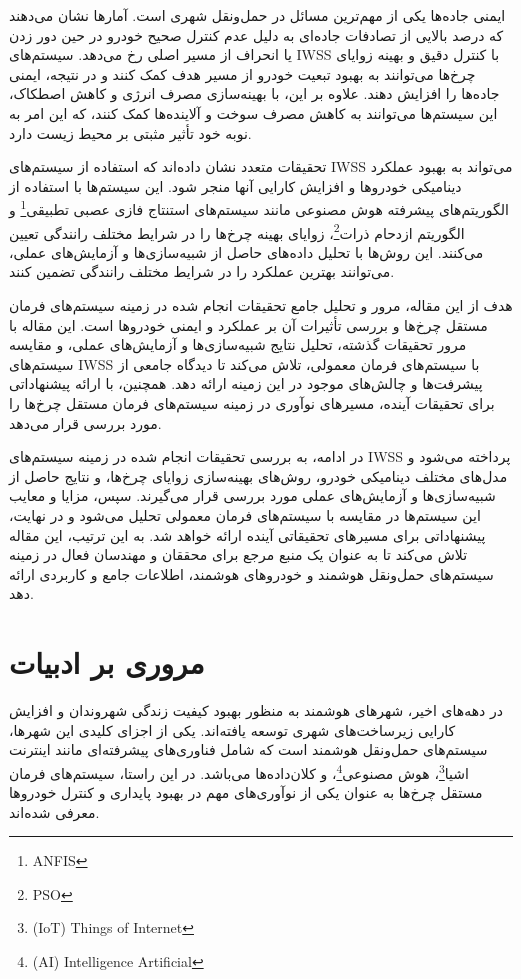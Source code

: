 \documentclass[a4paper,10pt]{article}
\begin{document}
        ایمنی جاده‌ها یکی از مهم‌ترین مسائل در حمل‌ونقل شهری است. آمارها نشان می‌دهند که درصد بالایی از تصادفات جاده‌ای به دلیل عدم کنترل صحیح خودرو در حین دور زدن یا انحراف از مسیر اصلی رخ می‌دهد. سیستم‌های IWSS با کنترل دقیق و بهینه زوایای چرخ‌ها می‌توانند به بهبود تبعیت خودرو از مسیر هدف کمک کنند و در نتیجه، ایمنی جاده‌ها را افزایش دهند. علاوه بر این، با بهینه‌سازی مصرف انرژی و کاهش اصطکاک، این سیستم‌ها می‌توانند به کاهش مصرف سوخت و آلاینده‌ها کمک کنند، که این امر به نوبه خود تأثیر مثبتی بر محیط زیست دارد.

        تحقیقات متعدد نشان داده‌اند که استفاده از سیستم‌های IWSS می‌تواند به بهبود عملکرد دینامیکی خودروها و افزایش کارایی آنها منجر شود. این سیستم‌ها با استفاده از الگوریتم‌های پیشرفته هوش مصنوعی مانند سیستم‌های استنتاج فازی عصبی تطبیقی\footnote{\hspace{2pt}ANFIS} و الگوریتم ازدحام ذرات\footnote{\hspace{2pt}PSO}، زوایای بهینه چرخ‌ها را در شرایط مختلف رانندگی تعیین می‌کنند. این روش‌ها با تحلیل داده‌های حاصل از شبیه‌سازی‌ها و آزمایش‌های عملی، می‌توانند بهترین عملکرد را در شرایط مختلف رانندگی تضمین کنند.

        هدف از این مقاله، مرور و تحلیل جامع تحقیقات انجام شده در زمینه سیستم‌های فرمان مستقل چرخ‌ها و بررسی تأثیرات آن بر عملکرد و ایمنی خودروها است. این مقاله با مرور تحقیقات گذشته، تحلیل نتایج شبیه‌سازی‌ها و آزمایش‌های عملی، و مقایسه سیستم‌های IWSS با سیستم‌های فرمان معمولی، تلاش می‌کند تا دیدگاه جامعی از پیشرفت‌ها و چالش‌های موجود در این زمینه ارائه دهد. همچنین، با ارائه پیشنهاداتی برای تحقیقات آینده، مسیرهای نوآوری در زمینه سیستم‌های فرمان مستقل چرخ‌ها را مورد بررسی قرار می‌دهد.

        در ادامه، به بررسی تحقیقات انجام شده در زمینه سیستم‌های IWSS پرداخته می‌شود و مدل‌های مختلف دینامیکی خودرو، روش‌های بهینه‌سازی زوایای چرخ‌ها، و نتایج حاصل از شبیه‌سازی‌ها و آزمایش‌های عملی مورد بررسی قرار می‌گیرند. سپس، مزایا و معایب این سیستم‌ها در مقایسه با سیستم‌های فرمان معمولی تحلیل می‌شود و در نهایت، پیشنهاداتی برای مسیرهای تحقیقاتی آینده ارائه خواهد شد. به این ترتیب، این مقاله تلاش می‌کند تا به عنوان یک منبع مرجع برای محققان و مهندسان فعال در زمینه سیستم‌های حمل‌ونقل هوشمند و خودروهای هوشمند، اطلاعات جامع و کاربردی ارائه دهد.

    \section{مروری بر ادبیات}

        در دهه‌های اخیر، شهرهای هوشمند به منظور بهبود کیفیت زندگی شهروندان و افزایش کارایی زیرساخت‌های شهری توسعه یافته‌اند. یکی از اجزای کلیدی این شهرها، سیستم‌های حمل‌ونقل هوشمند است که شامل فناوری‌های پیشرفته‌ای مانند اینترنت اشیا\footnote{\hspace{2pt}(IoT) Things of Internet}، هوش مصنوعی\footnote{\hspace{2pt}(AI) Intelligence Artificial}، و کلان‌داده‌ها می‌باشد. در این راستا، سیستم‌های فرمان مستقل چرخ‌ها به عنوان یکی از نوآوری‌های مهم در بهبود پایداری و کنترل خودروها معرفی شده‌اند.
\end{document}
